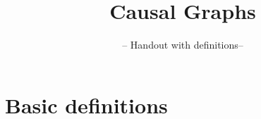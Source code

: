 

\usepackage{graphicx}
\newcommand\sbullet[1][.5]{\mathbin{\vcenter{\hbox{\scalebox{#1}{$\bullet$}}}}}
\usepackage[export]{adjustbox}

\title{Causal Graphs}
\subtitle{-- Handout with definitions--}
\date{}

\maketitle\vspace{-2cm}

\section*{Basic definitions}

